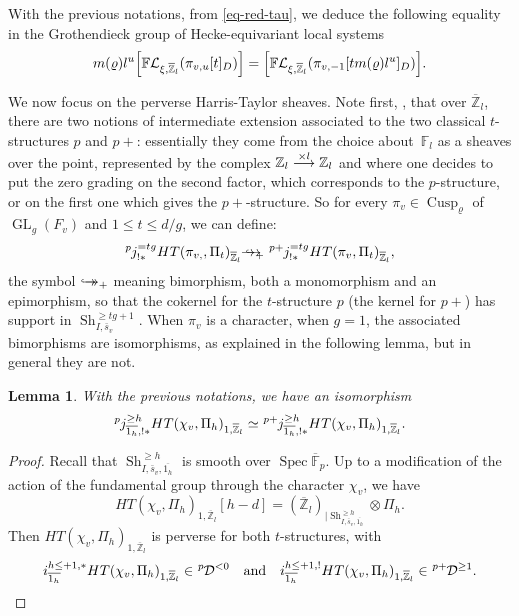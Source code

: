 \documentclass[JEP,XML,SOM,Unicode,published]{cedram}
\newcommand{\onto}{\mathchoice{\to\hspace*{-5mm}\to}{\to\hspace*{-2.85mm}\to}{\to\hspace*{-3mm}\to}{\to\hspace*{-3mm}\to}}
\def\To#1{\mathchoice{\xrightarrow{\textstyle\kern4pt#1\kern3pt}}{\stackrel{#1}{\longrightarrow}}{}{}}
\DeclareMathOperator{\GL}{GL}
\newcommand*{\htarrow}{\lhook\joinrel\onto}
\newcommand*{\htarrowp}{\mathrel{{\htarrow}_+}}
\theoremstyle{plain}
\newtheorem{lemma}[equation]{Lemma}
\theoremstyle{definition}
\numberwithin{equation}{subsection}
\newcommand\Fm{{\mathbb F}}
\newcommand\Zm{{\mathbb Z}}
\newcommand\DC{{\mathcal D}}
\newcommand\LC{{\mathcal L}}
\newcommand{\lexp}[2]{\kern \scriptspace \vphantom{#2}^{#1}\kern-\scriptspace#2}
\DeclareMathOperator{\sh}{Sh}
\DeclareMathOperator{\cusp}{Cusp}
\DeclareMathOperator{\spec}{Spec}
\begin{document}
With the previous notations, from \eqref{eq-red-tau}, we deduce the following equality in the
Grothendieck group of Hecke-equivariant local systems
\begin{equation} \label{eq-chgt-cuspi}
m(\varrho)l^{u}\Bigl [ \Fm \LC_{\xi,\overline \Zm_l}(\pi_{v,u}[t]_D) \Bigr ] =
\Bigl [ \Fm \LC_{\xi,\overline \Zm_l}(\pi_{v,-1}[tm(\varrho)l^u]_D) \Bigr ].
\end{equation}

We now focus on the perverse Harris-Taylor sheaves. Note first, \cf \cite[(2.2--2.4)]{juteau}, that over
$\overline \Zm_l$, there are two notions of intermediate extension associated to
the two classical $t$-structures $p$ and $p+$: essentially they come from
the choice about~$\Fm_l$ as a sheaves over the point, represented by the
complex $\Zm_l \To{\times l} \Zm_l$ and where one decides to
put the zero grading on the second factor, which corresponds to the $p$-structure, or on the first one which gives the $p+$-structure.
So for every $\pi_v \in \cusp_{\varrho}$ of $\GL_g(F_v)$ and $1 \leq t \leq d/g$, we can define:
\begin{equation} \label{eq-bimorphism}
\lexp p j^{=tg}_{!*} HT(\pi_{v,},\Pi_t)_{\overline \Zm_l} \htarrowp \lexp {p+} j^{=tg}_{!*} HT(\pi_{v},\Pi_t)_{\overline \Zm_l},
\end{equation}
the symbol $\htarrowp$ meaning bimorphism, \ie both a monomorphism and an epimorphism, so that
the cokernel for the $t$-structure $p$ (\resp the kernel for $p+$) has support in
$\sh^{\geq tg+1}_{I,\bar s_v}$. When $\pi_v$ is a character, \ie when $g=1$, the associated
bimorphisms are isomorphisms, as explained in the following lemma,
but in general they are not.

\begin{lemma} \label{lem-ext0}
With the previous notations, we have an isomorphism
\[
\lexp p j^{\geq h}_{\overline{1_h},!*} HT(\chi_v,\Pi_h)_{1,\overline \Zm_l}
\simeq \lexp {p+} j^{\geq h}_{\overline{1_h},!*} HT(\chi_v,\Pi_h)_{1,\overline \Zm_l}.
\]
\end{lemma}

\begin{proof}
Recall that $\sh^{\geq h}_{I,\bar s_v,\overline{1_h}}$ is smooth over
$\spec \overline \Fm_p$. Up to a modification of the action of the fundamental
group through the character $\chi_v$, we have
\[
HT(\chi_v,\Pi_h)_{1,\overline \Zm_l}[h-d]= (\overline \Zm_l)_{|\sh^{\geq h}_{I,\bar s_v,\overline{1_h}}} \otimes \Pi_h.
\]
Then $HT(\chi_v,\Pi_h)_{1,\overline \Zm_l}$ is perverse for both $t$-structures, with
\[
i^{h \leq +1,*}_{\overline{1_h}} HT(\chi_v,\Pi_h)_{1,\overline \Zm_l} \in
\lexp p \DC^{< 0} \quad\text{and}\quad
i^{h \leq +1,!}_{\overline{1_h}} HT(\chi_v,\Pi_h)_{1,\overline \Zm_l} \in
\lexp {p+} \DC^{\geq 1}.\qedhere
\]
\end{proof}
\end{document}

